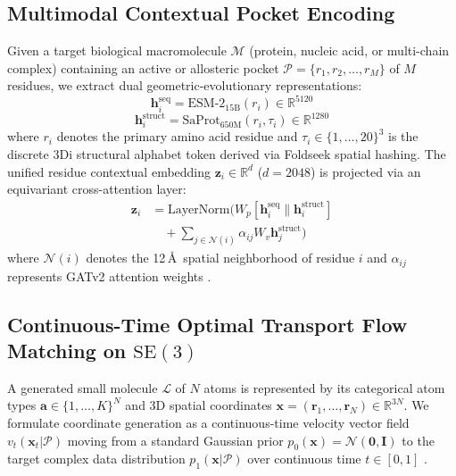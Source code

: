 \subsection{Multimodal Contextual Pocket Encoding}
Given a target biological macromolecule $\mathcal{M}$ (protein, nucleic acid, or multi-chain complex) containing an active or allosteric pocket $\mathcal{P} = \{r_1, r_2, \dots, r_M\}$ of $M$ residues, we extract dual geometric-evolutionary representations:
\begin{equation}
\mathbf{h}_i^{\text{seq}} = \text{ESM-2}_{15\text{B}}(r_i) \in \mathbb{R}^{5120}
\label{eq:esm_embed}
\end{equation}
\begin{equation}
\mathbf{h}_i^{\text{struct}} = \text{SaProt}_{650\text{M}}(r_i, \tau_i) \in \mathbb{R}^{1280}
\label{eq:saprot_embed}
\end{equation}
where $r_i$ denotes the primary amino acid residue and $\tau_i \in \{1, \dots, 20\}^3$ is the discrete 3Di structural alphabet token derived via Foldseek spatial hashing. The unified residue contextual embedding $\mathbf{z}_i \in \mathbb{R}^{d}$ ($d = 2048$) is projected via an equivariant cross-attention layer:
\begin{equation}
\begin{split}
\mathbf{z}_i &= \text{LayerNorm}\Big( W_p [\mathbf{h}_i^{\text{seq}} \parallel \mathbf{h}_i^{\text{struct}}] \\
&\quad + \sum_{j \in \mathcal{N}(i)} \alpha_{ij} W_v \mathbf{h}_j^{\text{struct}} \Big)
\end{split}
\label{eq:unified_pocket_embed}
\end{equation}
where $\mathcal{N}(i)$ denotes the 12\,\AA\ spatial neighborhood of residue $i$ and $\alpha_{ij}$ represents GATv2 attention weights \cite{brody2022attentive}.

\subsection{Continuous-Time Optimal Transport Flow Matching on $\mathrm{SE}(3)$}
A generated small molecule $\mathcal{L}$ of $N$ atoms is represented by its categorical atom types $\mathbf{a} \in \{1, \dots, K\}^N$ and 3D spatial coordinates $\mathbf{x} = (\mathbf{r}_1, \dots, \mathbf{r}_N) \in \mathbb{R}^{3N}$. We formulate coordinate generation as a continuous-time velocity vector field $v_t(\mathbf{x}_t | \mathcal{P})$ moving from a standard Gaussian prior $p_0(\mathbf{x}) = \mathcal{N}(\mathbf{0}, \mathbf{I})$ to the target complex data distribution $p_1(\mathbf{x} | \mathcal{P})$ over continuous time $t \in [0, 1]$ \cite{lipman2023flow,albergo2023building}.

